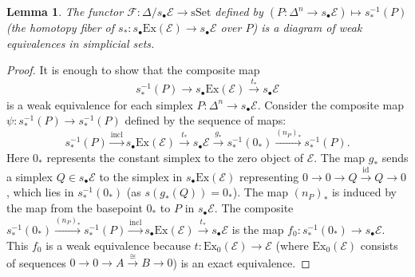 \documentclass[12pt]{report}
\numberwithin{equation}{section}
\newtheorem{lemma}[dummy]{Lemma}
\begin{document}
	\begin{lemma}\label{lem:foradditivity}
		The functor $\mathcal{F}: \Delta/s_\bullet\mathcal{E} \to \mathrm{sSet}$ defined by $(P: \Delta^n \to s_\bullet\mathcal{E}) \mapsto s_*^{-1}(P)$ (the homotopy fiber of $s_*: s_\bullet\mathrm{Ex}(\mathcal{E}) \to s_\bullet\mathcal{E}$ over $P$) is a diagram of weak equivalences in simplicial sets.
	\end{lemma}
	\begin{proof}
		It is enough to show that the composite map
		\[ s_*^{-1}(P) \to s_\bullet\mathrm{Ex}(\mathcal{E}) \xrightarrow{t_*} s_\bullet\mathcal{E} \]
		is a weak equivalence for each simplex $P: \Delta^n \to s_\bullet\mathcal{E}$.
		Consider the composite map $\psi : s_*^{-1}(P) \to s_*^{-1}(P)$ defined by the sequence of maps:
		\[ s_*^{-1}(P) \xrightarrow{\text{incl}} s_\bullet\mathrm{Ex}(\mathcal{E}) \xrightarrow{t_*} s_\bullet\mathcal{E} \xrightarrow{g_*} s_*^{-1}(0_*) \xrightarrow{(n_P)_*} s_*^{-1}(P). \]
		Here $0_*$ represents the constant simplex to the zero object of $\mathcal{E}$. The map $g_*$ sends a simplex $Q \in s_\bullet\mathcal{E}$ to the simplex in $s_\bullet\mathrm{Ex}(\mathcal{E})$ representing $0 \to 0 \to Q \xrightarrow{\mathrm{id}} Q \to 0$, which lies in $s_*^{-1}(0_*)$ (as $s(g_*(Q))=0_*$). The map $(n_P)_*$ is induced by the map from the basepoint $0_*$ to $P$ in $s_\bullet\mathcal{E}$.
		The composite $s_*^{-1}(0_*) \xrightarrow{(n_P)_*} s_*^{-1}(P) \xrightarrow{\text{incl}} s_\bullet\mathrm{Ex}(\mathcal{E}) \xrightarrow{t_*} s_\bullet\mathcal{E}$ is the map $f_0 : s_*^{-1}(0_*) \to s_\bullet\mathcal{E}$. This $f_0$ is a weak equivalence because $t: \mathrm{Ex}_0(\mathcal{E}) \to \mathcal{E}$ (where $\mathrm{Ex}_0(\mathcal{E})$ consists of sequences $0 \to 0 \to A \xrightarrow{\cong} B \to 0$) is an exact equivalence.
		

\end{proof}
\end{document}
